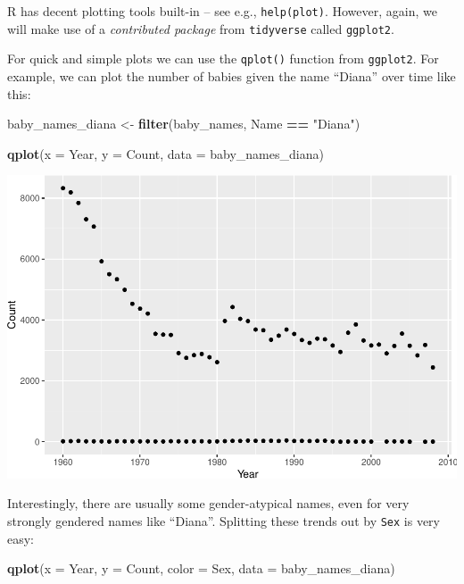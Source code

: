 \documentclass[
]{book}
\newenvironment{Shaded}{\begin{snugshade}}{\end{snugshade}}
\newcommand{\DataTypeTok}[1]{\textcolor[rgb]{0.13,0.29,0.53}{#1}}
\newcommand{\KeywordTok}[1]{\textcolor[rgb]{0.13,0.29,0.53}{\textbf{#1}}}
\newcommand{\NormalTok}[1]{#1}
\newcommand{\OperatorTok}[1]{\textcolor[rgb]{0.81,0.36,0.00}{\textbf{#1}}}
\newcommand{\StringTok}[1]{\textcolor[rgb]{0.31,0.60,0.02}{#1}}
\begin{document}
R has decent plotting tools built-in -- see e.g., \texttt{help(plot)}.
However, again, we will make use of a \emph{contributed
package} from \texttt{tidyverse} called \texttt{ggplot2}.

For quick and simple plots we can use the \texttt{qplot()} function from \texttt{ggplot2}. For example,
we can plot the number of babies given the name ``Diana'' over time like this:

\begin{Shaded}
\begin{Highlighting}[]
\NormalTok{baby_names_diana <-}\StringTok{ }\KeywordTok{filter}\NormalTok{(baby_names, Name }\OperatorTok{==}\StringTok{ "Diana"}\NormalTok{)}
\end{Highlighting}
\end{Shaded}

\begin{Shaded}
\begin{Highlighting}[]
\KeywordTok{qplot}\NormalTok{(}\DataTypeTok{x =}\NormalTok{ Year, }\DataTypeTok{y =}\NormalTok{ Count,}
     \DataTypeTok{data =}\NormalTok{ baby_names_diana)}
\end{Highlighting}
\end{Shaded}

\includegraphics{R/Rintro/figures/unnamed-chunk-33-1.pdf}

Interestingly, there are usually some gender-atypical names, even for very strongly
gendered names like ``Diana''. Splitting these trends out by \texttt{Sex} is very easy:

\begin{Shaded}
\begin{Highlighting}[]
\KeywordTok{qplot}\NormalTok{(}\DataTypeTok{x =}\NormalTok{ Year, }\DataTypeTok{y =}\NormalTok{ Count, }\DataTypeTok{color =}\NormalTok{ Sex,}
      \DataTypeTok{data =}\NormalTok{ baby_names_diana)}
\end{Highlighting}
\end{Shaded}
\end{document}
